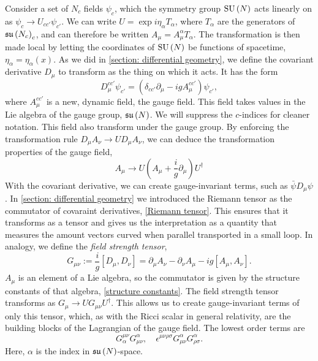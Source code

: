 Consider a set of $N_c$ fields $\psi_c$, which the symmetry group $\text{SU}\left(N\right)$ acts linearly on as $\psi_c \rightarrow U_{cc'} \psi_{c'}$.
We can write $U = \exp{i \eta_\alpha T_\alpha}$, where $T_\alpha$ are the generators of $\mathfrak{su}\left(N_c\right)_c$, and can therefore be written $A_\mu = A_\mu^\alpha T_\alpha$.
The transformation is then made local by letting the coordinates of $\text{SU}\left(N\right)$ be functions of spacetime, $\eta_\alpha = \eta_\alpha(x)$.
As we did in \autoref{section: differential geometry}, we define the covariant derivative $D_\mu$ to transform as the thing on which it acts.
It has the form
%
\begin{equation}
    \label{covariant derivative Yang-Mills}
    D_\mu^{cc'} \psi_{c'} = (\delta_{cc'}\partial_\mu - i g A_\mu^{cc'} )\psi_{c'},
\end{equation}
%
where $A_\mu^{cc'}$ is a new, dynamic field, the gauge field.
This field takes values in the Lie algebra of the gauge group, $\mathfrak{su}\left(N\right)$.
We will suppress the $c$-indices for cleaner notation.
This field also transform under the gauge group.
By enforcing the transformation rule $D_\mu A_\nu \rightarrow U D_\mu A_\nu$, we can deduce the transformation properties of the gauge field, 
%
\begin{equation}
    \label{Gauge transformation gauge field}
    A_\mu\rightarrow U \left(A_\mu + \frac{i}{g} \partial_\mu\right) U^\dagger
\end{equation}
%
With the covariant derivative, we can create gauge-invariant terms, such as $\bar \psi D_\mu \psi$.
In \autoref{section: differential geometry} we introduced the Riemann tensor as the commutator of covaraint derivatives, \autoref{Riemann tensor}.
This ensures that it transforms as a tensor and gives us the interpretation as a quantity that measures the amount vectors curved when parallel transported in a small loop.
In analogy, we define the \emph{field strength tensor},
%
\begin{equation}
    G_{\mu \nu} := \frac{i}{g} [D_\mu, D_\nu]
    = \partial_\mu A_\nu - \partial_\nu A_\mu - i g[A_\mu, A_\nu].
\end{equation}
%
$A_\mu$ is an element of a Lie algebra, so the commutator is given by the structure constants of that algebra, \autoref{structure constants}.
The field strength tensor transforms as $G_\mu \rightarrow U G_{\mu \nu}U^\dagger$.
This allows us to create gauge-invariant terms of only this tensor, which, as with the Ricci scalar in general relativity, are the building blocks of the Lagrangian of the gauge field.
The lowest order terms are
%
\begin{equation}
    G^{\mu \nu}_\alpha G_{\mu \nu}^\alpha, \quad
    \epsilon^{\mu \nu \rho \sigma} G_{\mu \nu}^\alpha G_{\rho \sigma}^\alpha.
\end{equation}
%
Here, $\alpha$ is the index in $\mathfrak{su}\left(N\right)$-space.



